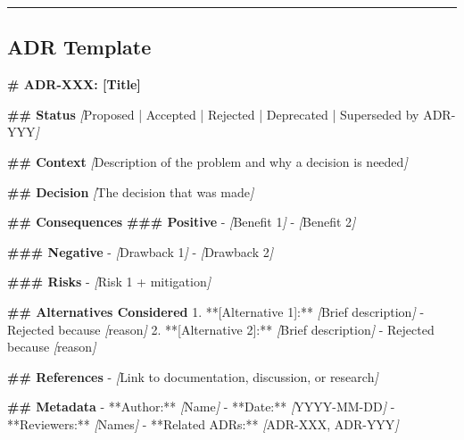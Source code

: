 \documentclass[
]{article}
\newenvironment{Shaded}{\begin{snugshade}}{\end{snugshade}}
\newcommand{\CommentTok}[1]{\textcolor[rgb]{0.56,0.35,0.01}{\textit{#1}}}
\newcommand{\FunctionTok}[1]{\textcolor[rgb]{0.13,0.29,0.53}{\textbf{#1}}}
\newcommand{\NormalTok}[1]{#1}
\newcommand{\OtherTok}[1]{\textcolor[rgb]{0.56,0.35,0.01}{#1}}
\newcommand{\SpecialStringTok}[1]{\textcolor[rgb]{0.31,0.60,0.02}{#1}}
\begin{document}
\begin{center}\rule{0.5\linewidth}{0.5pt}\end{center}

\hypertarget{adr-template}{%
\subsection{ADR Template}\label{adr-template}}

\begin{Shaded}
\begin{Highlighting}[]
\FunctionTok{\# ADR{-}XXX: [Title]}

\FunctionTok{\#\# Status}
\CommentTok{[}\OtherTok{Proposed | Accepted | Rejected | Deprecated | Superseded by ADR{-}YYY}\CommentTok{]}

\FunctionTok{\#\# Context}
\CommentTok{[}\OtherTok{Description of the problem and why a decision is needed}\CommentTok{]}

\FunctionTok{\#\# Decision}
\CommentTok{[}\OtherTok{The decision that was made}\CommentTok{]}

\FunctionTok{\#\# Consequences}
\FunctionTok{\#\#\# Positive}
\SpecialStringTok{{-} }\CommentTok{[}\OtherTok{Benefit 1}\CommentTok{]}
\SpecialStringTok{{-} }\CommentTok{[}\OtherTok{Benefit 2}\CommentTok{]}

\FunctionTok{\#\#\# Negative}
\SpecialStringTok{{-} }\CommentTok{[}\OtherTok{Drawback 1}\CommentTok{]}
\SpecialStringTok{{-} }\CommentTok{[}\OtherTok{Drawback 2}\CommentTok{]}

\FunctionTok{\#\#\# Risks}
\SpecialStringTok{{-} }\CommentTok{[}\OtherTok{Risk 1 + mitigation}\CommentTok{]}

\FunctionTok{\#\# Alternatives Considered}
\SpecialStringTok{1. }\NormalTok{**[Alternative 1]:** }\CommentTok{[}\OtherTok{Brief description}\CommentTok{]}\NormalTok{ {-} Rejected because }\CommentTok{[}\OtherTok{reason}\CommentTok{]}
\SpecialStringTok{2. }\NormalTok{**[Alternative 2]:** }\CommentTok{[}\OtherTok{Brief description}\CommentTok{]}\NormalTok{ {-} Rejected because }\CommentTok{[}\OtherTok{reason}\CommentTok{]}

\FunctionTok{\#\# References}
\SpecialStringTok{{-} }\CommentTok{[}\OtherTok{Link to documentation, discussion, or research}\CommentTok{]}

\FunctionTok{\#\# Metadata}
\SpecialStringTok{{-} }\NormalTok{**Author:** }\CommentTok{[}\OtherTok{Name}\CommentTok{]}
\SpecialStringTok{{-} }\NormalTok{**Date:** }\CommentTok{[}\OtherTok{YYYY{-}MM{-}DD}\CommentTok{]}
\SpecialStringTok{{-} }\NormalTok{**Reviewers:** }\CommentTok{[}\OtherTok{Names}\CommentTok{]}
\SpecialStringTok{{-} }\NormalTok{**Related ADRs:** }\CommentTok{[}\OtherTok{ADR{-}XXX, ADR{-}YYY}\CommentTok{]}
\end{Highlighting}
\end{Shaded}
\end{document}
